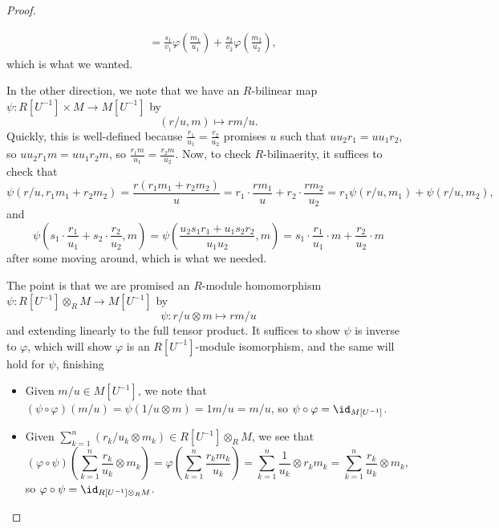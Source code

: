 \begin{proof}
\begin{itemize}
\begin{align*}
			&= \frac{s_1}{v_1}\varphi\left(\frac{m_1}{u_1}\right)+\frac{s_2}{v_2}\varphi\left(\frac{m_2}{u_2}\right),
		\end{align*}
		which is what we wanted.
	\end{itemize}
	In the other direction, we note that we have an $R$-bilinear map $\psi:R\left[U^{-1}\right]\times M\to M\left[U^{-1}\right]$ by
	\[(r/u,m)\mapsto rm/u.\]
	Quickly, this is well-defined because $\frac{r_1}{u_1}=\frac{r_2}{u_2}$ promises $u$ such that $uu_2r_1=uu_1r_2$, so $uu_2r_1m=uu_1r_2m$, so $\frac{r_1m}{u_1}=\frac{r_2m}{u_2}$. Now, to check $R$-bilinaerity, it suffices to check that
	\[\psi(r/u,r_1m_1+r_2m_2)=\frac{r(r_1m_1+r_2m_2)}u=r_1\cdot\frac{rm_1}u+r_2\cdot\frac{rm_2}{u_2}=r_1\psi(r/u,m_1)+\psi(r/u,m_2),\]
	and
	\[\psi\left(s_1\cdot\frac{r_1}{u_1}+s_2\cdot\frac{r_2}{u_2},m\right)=\psi\left(\frac{u_2s_1r_1+u_1s_2r_2}{u_1u_2},m\right)=s_1\cdot\frac{r_1}{u_1}\cdot m+\frac{r_2}{u_2}\cdot m\]
	after some moving around, which is what we needed.

	The point is that we are promised an $R$-module homomorphism $\psi:R\left[U^{-1}\right]\otimes_RM\to M\left[U^{-1}\right]$ by
	\[\boxed{\psi:r/u\otimes m\mapsto rm/u}\]
	and extending linearly to the full tensor product. It suffices to show $\psi$ is inverse to $\varphi$, which will show $\varphi$ is an $R\left[U^{-1}\right]$-module isomorphism, and the same will hold for $\psi$, finishing
	\begin{itemize}
		\item Given $m/u\in M\left[U^{-1}\right]$, we note that $(\psi\circ\varphi)(m/u)=\psi(1/u\otimes m)=1m/u=m/u$, so $\psi\circ\varphi=\id_{M\left[U^{-1}\right]}$.
		\item Given $\sum_{k=1}^n(r_k/u_k\otimes m_k)\in R\left[U^{-1}\right]\otimes_RM$, we see that
		\[(\varphi\circ\psi)\left(\sum_{k=1}^n\frac{r_k}{u_k}\otimes m_k\right)=\varphi\left(\sum_{k=1}^n\frac{r_km_k}{u_k}\right)=\sum_{k=1}^n\frac1{u_k}\otimes r_km_k=\sum_{k=1}^n\frac{r_k}{u_k}\otimes m_k,\]
		so $\varphi\circ\psi=\id_{R\left[U^{-1}\right]\otimes_RM}$.
		\qedhere
	\end{itemize}
\end{proof}
